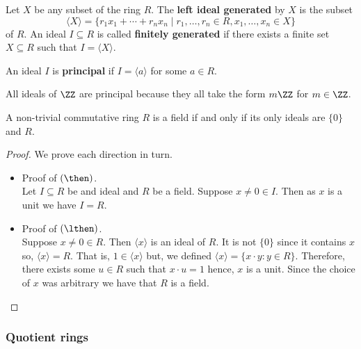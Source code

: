 \documentclass[12pt, a4paper]{article}
\begin{document}
\begin{definition}
    Let \(X\) be any subset of the ring \(R\). The \textbf{left ideal generated} by \(X\) is the subset 
    \[\langle X \rangle = \{r_1 x_1+\cdots +r_n x_n \mid r_1,\ldots, r_n \in R , x_1,\ldots, x_n \in X\}\]
    of \(R\). An ideal \(I \subseteq R\) is called \textbf{finitely generated} if there exists a finite set \(X \subseteq R\) such that \(I =\langle X \rangle\).
\end{definition}

\begin{definition}
    An ideal \(I\) is \textbf{principal} if \(I = \langle a\rangle\) for some \(a\in R\).
\end{definition}

\begin{example}
    All ideals of \(\ZZ\) are principal because they all take the form \(m\ZZ\) for \(m \in \ZZ\).
\end{example}

\begin{mdprop}
    A non-trivial commutative ring \(R\) is a field if and only if its only ideals are \(\{0\}\) and \(R\).
\end{mdprop}

\begin{proof}
    We prove each direction in turn.
    \begin{itemize}
        \item Proof of \((\then)\). \\
        Let \(I\subseteq R\) be and ideal and \(R\) be a field. Suppose \(x\neq 0 \in I\). Then as \(x\) is a unit we have \(I=R\).
        \item Proof of \((\lthen)\).\\
        Suppose \(x \neq 0 \in R\). Then \(\langle x\rangle \) is an ideal of \(R\). It is not \(\{0\}\) since it contains \(x\) so, \(\langle x\rangle =R\). That is, \(1 \in \langle x \rangle\) but, we defined \(\langle x\rangle = \{x\cdot y : y\in R\}\). Therefore, there exists some \(u \in R\) such that \(x\cdot u =1\) hence, \(x\) is a unit. Since the choice of \(x\) was arbitrary we have that \(R\) is a field.
    \end{itemize}
\end{proof}

\subsubsection{Quotient rings}
\end{document}
